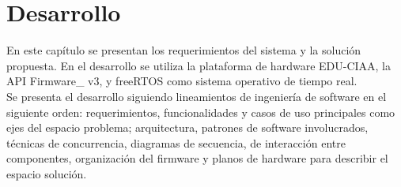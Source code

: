 \chapter{Desarrollo} %

En este capítulo se presentan los requerimientos del sistema y la solución propuesta. En el desarrollo se utiliza la plataforma de hardware EDU-CIAA\cite{CIAA}, la API Firmware\_ v3\cite{firmwareV3}, y freeRTOS\cite{freeRTOS} como sistema operativo de tiempo real.\\

Se presenta el desarrollo siguiendo lineamientos de ingeniería de software en el siguiente orden: requerimientos, funcionalidades y casos de uso principales como ejes del espacio problema; arquitectura, patrones de software involucrados, técnicas de concurrencia, diagramas de secuencia, de interacción entre componentes, organización del firmware y planos de hardware para describir el espacio solución.\\


\label{Chapter3} %


